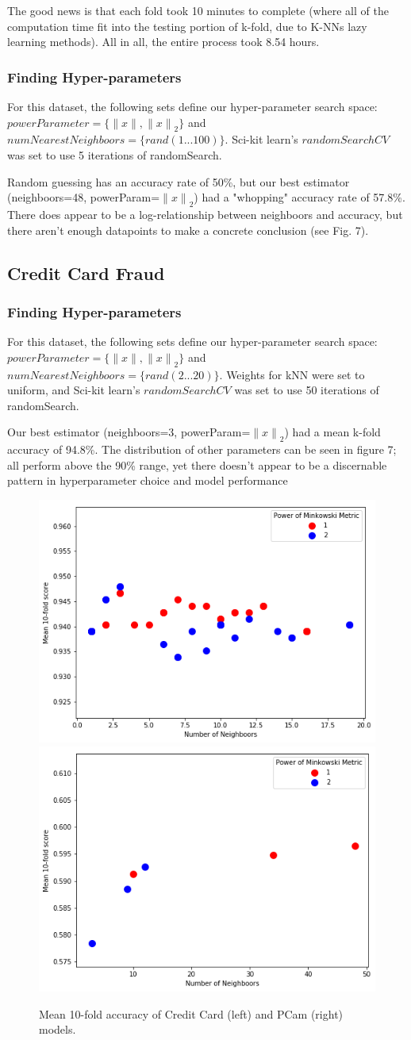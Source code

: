 \documentclass[a4paper]{article}
\begin{document}
The good news is that each fold took 10 minutes to complete (where all of the computation time fit into the testing portion of k-fold, due to K-NNs lazy learning methods). All in all, the entire process took 8.54 hours.
\subsubsection{Finding Hyper-parameters}
For this dataset, the following sets define our hyper-parameter search space:  $powerParameter = \{\| x\|, {\| x\|}_{2}\}$ and $numNearestNeighboors = \{rand(1...100)\}$. Sci-kit learn's $randomSearchCV$ was set to use 5 iterations of randomSearch.

Random guessing has an accuracy rate of 50\%, but our best estimator (neighboors=48, powerParam=${\| x\|}_{2}$) had a "whopping" accuracy rate of 57.8\%. There does appear to be a log-relationship between neighboors and accuracy, but there aren't enough datapoints to make a concrete conclusion (see Fig. 7).
\subsection{Credit Card Fraud}
\subsubsection{Finding Hyper-parameters}
For this dataset, the following sets define our hyper-parameter search space:  $powerParameter = \{\| x\|, {\| x\|}_{2}\}$ and $numNearestNeighboors = \{rand(2...20)\}$. Weights for kNN were set to uniform, and Sci-kit learn's $randomSearchCV$ was set to use 50 iterations of randomSearch. 

Our best estimator (neighboors=3, powerParam=${\| x\|}_{2}$) had a mean k-fold accuracy of 94.8\%. The distribution of other parameters can be seen in figure 7; all perform above the 90\% range, yet there doesn't appear to be a discernable pattern in hyperparameter choice and model performance

\begin{figure}
  \centering
  \includegraphics[width=.45\textwidth]{images/kNN_Credit.png}
  \includegraphics[width=.45\textwidth]{images/kNN_pcam.png}
  \caption{Mean 10-fold accuracy of Credit Card (left) and PCam (right) models.}
\end{figure}
\end{document}
